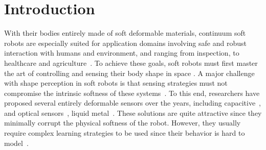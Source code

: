 \section{Introduction}\label{sec:srslam:introduction}
%
With their bodies entirely made of soft deformable materials, continuum soft robots are especially suited for application domains involving safe and robust interaction with humans and environment, and ranging from inspection, to healthcare and agriculture~\cite{majidi2014soft,elfferich2022soft}. To achieve these goals, soft robots must first master the art of controlling and sensing their body shape in space \cite{della2023model}.
%
%
%
A major challenge with shape perception in soft robots is that sensing strategies must not compromise the intrinsic softness of these systems~\cite{polygerinos2017soft,wang2018toward}. %
%
To this end, researchers have proposed several entirely deformable sensors over the years, including capacitive~\cite{scimeca2019model},  and optical sensors~\cite{li2021scaling}, liquid metal~\cite{wall2017method}. These solutions are quite attractive since they minimally corrupt the physical softness of the robot. However, they usually require complex learning strategies to be used since their behavior is hard to model~\cite{thuruthel2019soft,truby2020distributed}.
%

